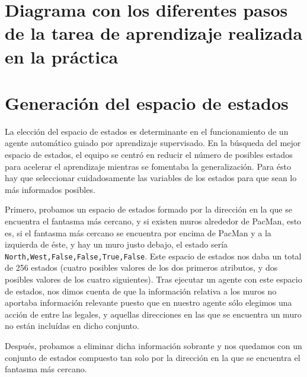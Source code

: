 \documentclass[12pt]{article}
\begin{document}
\newpage

\section{Diagrama con los diferentes pasos de la tarea de aprendizaje realizada en la práctica}

\section{Generación del espacio de estados}


La elección del espacio de estados es determinante en el funcionamiento de un agente automático guiado por aprendizaje supervisado. En la búsqueda del mejor espacio de estados, el equipo se centró en reducir el número de posibles estados para acelerar el aprendizaje mientras se fomentaba la generalización. Para ésto hay que seleccionar cuidadosamente las variables de los estados para que sean lo más informados posibles.

Primero, probamos un espacio de estados formado por la dirección en la que se encuentra el fantasma más cercano, y si existen muros alrededor de PacMan, esto es, si el fantasma más cercano se encuentra por encima de PacMan y a la izquierda de éste, y hay un muro justo debajo, el estado sería \texttt{North,West,False,False,True,False}. Este espacio de estados nos daba un total de 256 estados (cuatro posibles valores de los dos primeros atributos, y dos posibles valores de los cuatro siguientes). Tras ejecutar un agente con este espacio de estados, nos dimos cuenta de que la información relativa a los muros no aportaba información relevante puesto que en nuestro agente sólo elegimos una acción de entre las legales, y aquellas direcciones en las que se encuentra un muro no están incluídas en dicho conjunto.

Después, probamos a eliminar dicha información sobrante y nos quedamos con un conjunto de estados compuesto tan solo por la dirección en la que se encuentra el fantasma más cercano.
\end{document}
